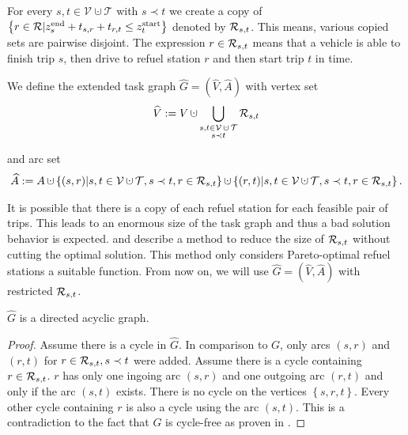 \begin{definition}
\label{def:extended_taskgraph}

For every $s,t\in\mathcal{V}\cupdot\mathcal{T}$ with $s\prec t$ we create a copy of $\left\{r\in\mathcal{R}|z^{\operatorname{end}}_s+t_{s,r}+t_{r,t}\leq z^{\operatorname{start}}_t\right\}$ denoted by $\mathcal{R}_{s,t}$. This means, various copied sets are pairwise disjoint. The expression $r\in\mathcal{R}_{s,t}$ means that a vehicle is able to finish trip $s$, then drive to refuel station $r$ and then start trip $t$ in time.

We define the extended task graph $\widehat{G}=\left(\widehat{V},\widehat{A}\right)$ with vertex set
\begin{align*}
	\widehat{V}:=V\cupdot\Cupdot_{\substack{s,t\in\mathcal{V}\cupdot\mathcal{T} \\ s\prec t}} \Rst
\end{align*}

and arc set
\begin{align*}
	\widehat{A}:=A\cupdot\left\{(s,r)|s,t\in\mathcal{V}\cupdot\mathcal{T},s\prec t,r\in\Rst\right\}\cupdot\left\{(r,t)|s,t\in\mathcal{V}\cupdot\mathcal{T},s\prec t,r\in\Rst\right\}.
\end{align*}

It is possible that there is a copy of each refuel station for each feasible pair of trips. This leads to an enormous size of the task graph and thus a bad solution behavior is expected. \cite{Kaiser} and \cite{Knoll} describe a method to reduce the size of $\mathcal{R}_{s,t}$ without cutting the optimal solution. This method only considers Pareto-optimal refuel stations \wrt a suitable function. From now on, we will use $\widehat{G}=\left(\widehat{V},\widehat{A}\right)$ with restricted $\mathcal{R}_{s,t}$.

\end{definition}

\begin{lemma}

$\widehat{G}$ is a directed acyclic graph.

\end{lemma}

\begin{proof}

Assume there is a cycle in $\widehat{G}$. In comparison to $G$, only arcs $(s,r)$ and $(r,t)$ for ${r\in\mathcal{R}_{s,t}, s\prec t}$ were added. Assume there is a cycle containing $r\in\mathcal{R}_{s,t}$. $r$ has only one ingoing arc $(s,r)$ and one outgoing arc $(r,t)$ and only if the arc $(s,t)$ exists. There is no cycle on the vertices $\left\{s,r,t\right\}$. Every other cycle containing $r$ is also a cycle using the arc $(s,t)$. This is a contradiction to the fact that $G$ is cycle-free as proven in .
%
\end{proof}

